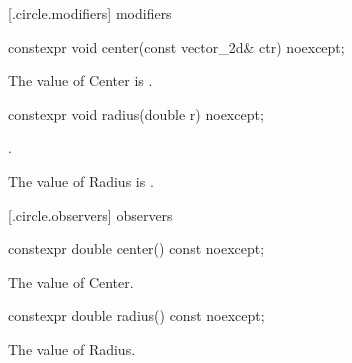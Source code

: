  [\iotwod.circle.modifiers]{ modifiers}

%
\begin{itemdecl}
constexpr void center(const vector_2d& ctr) noexcept;
\end{itemdecl}

\begin{itemdescr}
\pnum
\effects
The value of Center is .
\end{itemdescr}

%
\begin{itemdecl}
constexpr void radius(double r) noexcept;
\end{itemdecl}
\begin{itemdescr}
\requires
{}.

\pnum
\effects
The value of Radius is .
\end{itemdescr}

 [\iotwod.circle.observers]{ observers}

%
\begin{itemdecl}
constexpr double center() const noexcept;
\end{itemdecl}
\begin{itemdescr}
\pnum
\returns
The value of Center.
\end{itemdescr}

%
\begin{itemdecl}
constexpr double radius() const noexcept;
\end{itemdecl}
\begin{itemdescr}
\pnum
\returns
The value of Radius.
\end{itemdescr}
